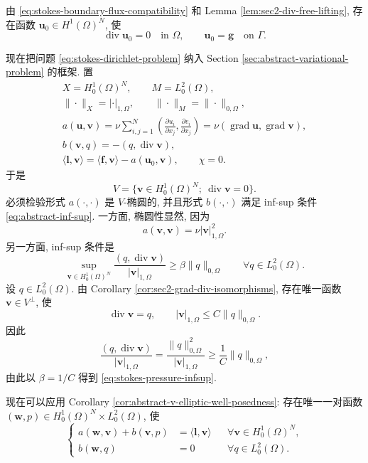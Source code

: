 \begin{Proof}
由 \eqref{eq:stokes-boundary-flux-compatibility} 和 Lemma
\ref{lem:sec2-div-free-lifting}, 存在函数
$\mathbf{u}_0\in H^1(\Omega)^N$, 使
\[
\operatorname{div}\mathbf{u}_0=0\quad\text{in }\Omega,
\qquad
\mathbf{u}_0=\mathbf{g}\quad\text{on }\Gamma.
\]

现在把问题 \eqref{eq:stokes-dirichlet-problem} 纳入 Section
\ref{sec:abstract-variational-problem} 的框架. 置
\begin{equation}\label{eq:stokes-dirichlet-abstract-data}
\begin{gathered}
X=H_0^1(\Omega)^N,\qquad M=L_0^2(\Omega),\\
\|\cdot\|_X=|\cdot|_{1,\Omega},
\qquad
\|\cdot\|_M=\|\cdot\|_{0,\Omega},\\
a(\mathbf{u},\mathbf{v})
=\nu\sum_{i,j=1}^{N}
\left(
\frac{\partial u_i}{\partial x_j},
\frac{\partial v_i}{\partial x_j}
\right)
=\nu(\operatorname{grad}\mathbf{u},
\operatorname{grad}\mathbf{v}),\\
b(\mathbf{v},q)=-(q,\operatorname{div}\mathbf{v}),\\
\langle\mathbf{l},\mathbf{v}\rangle
=\langle\mathbf{f},\mathbf{v}\rangle
-a(\mathbf{u}_0,\mathbf{v}),
\qquad \chi=0.
\end{gathered}
\end{equation}
于是
\[
V=\{\mathbf{v}\in H_0^1(\Omega)^N;
\ \operatorname{div}\mathbf{v}=0\}.
\]
必须检验形式 $a(\cdot,\cdot)$ 是 $V$-椭圆的,
并且形式 $b(\cdot,\cdot)$ 满足 inf-sup 条件
\eqref{eq:abstract-inf-sup}. 一方面, 椭圆性显然, 因为
\[
a(\mathbf{v},\mathbf{v})=\nu|\mathbf{v}|_{1,\Omega}^2.
\]
另一方面, inf-sup 条件是
\begin{equation}\label{eq:stokes-pressure-infsup}
\sup_{\mathbf{v}\in H_0^1(\Omega)^N}
\frac{(q,\operatorname{div}\mathbf{v})}
{|\mathbf{v}|_{1,\Omega}}
\ge\beta\|q\|_{0,\Omega}
\qquad\forall q\in L_0^2(\Omega).
\end{equation}
设 $q\in L_0^2(\Omega)$. 由 Corollary
\ref{cor:sec2-grad-div-isomorphisms}, 存在唯一函数
$\mathbf{v}\in V^\perp$, 使
\[
\operatorname{div}\mathbf{v}=q,
\qquad
|\mathbf{v}|_{1,\Omega}\le C\|q\|_{0,\Omega}.
\]
因此
\[
\frac{(q,\operatorname{div}\mathbf{v})}
{|\mathbf{v}|_{1,\Omega}}
=\frac{\|q\|_{0,\Omega}^2}
{|\mathbf{v}|_{1,\Omega}}
\ge\frac1C\|q\|_{0,\Omega},
\]
由此以 $\beta=1/C$ 得到 \eqref{eq:stokes-pressure-infsup}.

现在可以应用 Corollary
\ref{cor:abstract-v-elliptic-well-posedness}: 存在唯一一对函数
$(\mathbf{w},p)\in H_0^1(\Omega)^N\times L_0^2(\Omega)$, 使
\[
\left\{
\begin{aligned}
a(\mathbf{w},\mathbf{v})+b(\mathbf{v},p)
&=\langle\mathbf{l},\mathbf{v}\rangle
&&\forall\mathbf{v}\in H_0^1(\Omega)^N,\\
b(\mathbf{w},q)&=0
&&\forall q\in L_0^2(\Omega).
\end{aligned}
\right.
\]


\end{Proof}
